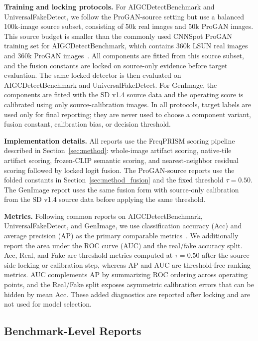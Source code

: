 \documentclass[lettersize,journal]{IEEEtran}
\begin{document}
\textbf{Training and locking protocols.}
For AIGCDetectBenchmark and UniversalFakeDetect, we follow the ProGAN-source setting but use a balanced 100k-image source subset, consisting of 50k real images and 50k ProGAN images. This source budget is smaller than the commonly used CNNSpot ProGAN training set for AIGCDetectBenchmark, which contains 360k LSUN real images and 360k ProGAN images~\cite{wang2020cnnspot,zhong2023patchcraft}. All components are fitted from this source subset, and the fusion constants are locked on source-only evidence before target evaluation. The same locked detector is then evaluated on AIGCDetectBenchmark and UniversalFakeDetect. For GenImage, the components are fitted with the SD v1.4 source data and the operating score is calibrated using only source-calibration images. In all protocols, target labels are used only for final reporting; they are never used to choose a component variant, fusion constant, calibration bias, or decision threshold.

\textbf{Implementation details.}
All reports use the FreqPRISM scoring pipeline described in Section~\ref{sec:method}: whole-image artifact scoring, native-tile artifact scoring, frozen-CLIP semantic scoring, and nearest-neighbor residual scoring followed by locked logit fusion. The ProGAN-source reports use the folded constants in Section~\ref{sec:method_fusion} and the fixed threshold $\tau=0.50$. The GenImage report uses the same fusion form with source-only calibration from the SD v1.4 source data before applying the same threshold.

\textbf{Metrics.}
Following common reports on AIGCDetectBenchmark, UniversalFakeDetect, and GenImage, we use classification accuracy (Acc) and average precision (AP) as the primary comparable metrics~\cite{ojha2023univfd,zhong2023patchcraft,zhu2023genimage,yan2025aide}. We additionally report the area under the ROC curve (AUC) and the real/fake accuracy split. Acc, Real, and Fake are threshold metrics computed at $\tau=0.50$ after the source-side locking or calibration step, whereas AP and AUC are threshold-free ranking metrics. AUC complements AP by summarizing ROC ordering across operating points, and the Real/Fake split exposes asymmetric calibration errors that can be hidden by mean Acc. These added diagnostics are reported after locking and are not used for model selection.

\subsection{Benchmark-Level Reports}
\label{sec:benchmark_reports}
\end{document}
